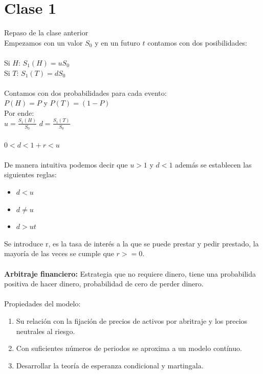 \documentclass{article}
\begin{document}
    \section{Clase 1}
        Repaso de la clase anterior
        \\
        Empezamos con un valor \(S_0\) y en un futuro \(t\) contamos con dos posibilidades:
        \\
        \\   
        Si \(H\): \(S_{1}(H) = u S_0\)
        \\
        Si \(T\): \(S_{1}(T) = d S_0\)
        \\
        \\
        Contamos con dos probabilidades para cada evento:
        \\
        \(P(H) = P\) y \(P(T) = (1-P)\)
        \\
        Por ende:
        \\
        \(u = \frac{S_1(H)}{S_0} \)
        \(d = \frac{S_1(T)}{S_0} \)
        \\
        \\
        \(0<d<1+r<u\)
        \\
        \\
        De manera intuitiva podemos decir que \(u>1\) y \(d<1\) además se establecen las siguientes reglas:
        \begin{itemize}
            \item \(d < u\)
            \item \(d \neq u\)
            \item \(d > ut\)
        \end{itemize}
        Se introduce r, es la tasa de interés a la que se puede prestar y pedir prestado, la mayoría de las veces se cumple que \(r>=0\).
        \\
        \\
        \textbf{Arbitraje financiero:} Estrategia que no requiere dinero, tiene una probabilida positiva de hacer dinero, probabilidad de cero de perder dinero.
        \\
        \\
        Propiedades del modelo:
        \begin{enumerate}
            \item Su relación con la fijación de precios de activos por abritraje y los precios neutrales al riesgo.
            \item Con suficientes números de periodos se aproxima a un modelo contínuo.
            \item Desarrollar la teoría de esperanza condicional y martingala.
        \end{enumerate}
\end{document}

